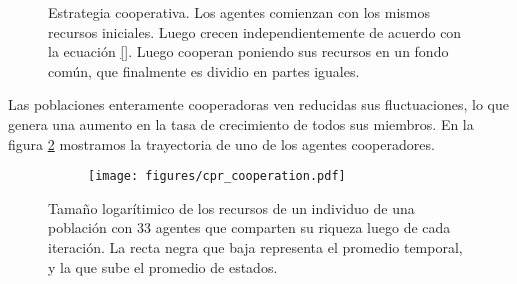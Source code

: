 \documentclass[a4paper,10pt]{article}
\begin{document}
\begin{figure}[H]
\centering
{}
\caption{Estrategia cooperativa. Los agentes comienzan con los mismos recursos iniciales. Luego crecen independientemente de acuerdo con la ecuaci\'on \ref{}. Luego cooperan poniendo sus recursos en un fondo común, que finalmente es dividio en partes iguales.}
\label{fig:protocolo}
\end{figure}

Las poblaciones enteramente cooperadoras ven reducidas sus fluctuaciones, lo que genera una aumento en la tasa de crecimiento de todos sus miembros.
En la figura \ref{fig:cpr_cooperation} mostramos la trayectoria de uno de los agentes cooperadores.
\begin{figure}[H]
    \centering
    \begin{subfigure}[b]{0.45\textwidth}
    \texttt{[image: figures/cpr\_cooperation.pdf]}
    \end{subfigure}
    \caption{
    Tamaño logarítimico de los recursos de un individuo de una población con 33 agentes que comparten su riqueza luego de cada iteración.
    La recta negra que baja representa el promedio temporal, y la que sube el promedio de estados.
    }
    \label{fig:cpr_cooperation}
\end{figure}
\end{document}
